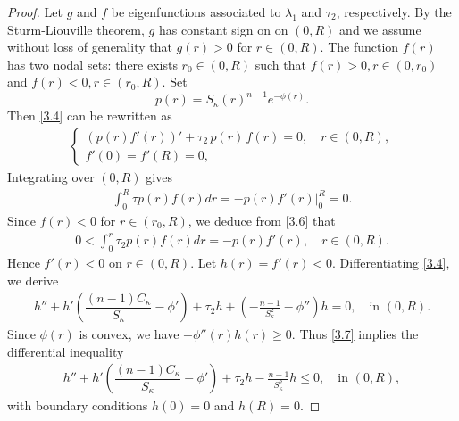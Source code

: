 \documentclass[10pt,a4paper]{amsart}
\def\k{\kappa}
\def\l{\lambda}
\begin{document}
\begin{proof}
 Let $g$ and $f$ be eigenfunctions associated to $\l_1$ and $\tau_2$, respectively.
By the Sturm-Liouville theorem,  $g$ has constant sign on on $(0,R)$ and we assume without loss of generality that $g(r)>0$ for $r\in (0,R)$. The function $f(r)$ has two nodal sets: there exists $r_{0}\in (0,R)$ such that $f(r)>0,r\in (0,r_{0})$ and $f(r)<0,r\in (r_{0},R)$.
Set
$$
p(r)=S_{\k}(r)^{n-1}e^{-\phi(r)}.
$$
Then  \eqref{3.4} can be rewritten as 
\begin{align*}
\begin{cases}
\left(p(r)f'(r)\right)' + \tau_2 \,p(r)\,f(r) = 0, \quad r\in (0, R),\\
f'(0) = f'(R) = 0,
\end{cases}
\end{align*}
Integrating over $(0,R)$ gives
\begin{align}\label{3.6}
    \int_{0}^{R}\tau p(r)f(r)dr=-p(r)f'(r)\Big|_{0}^{R}=0.
\end{align}
Since $f(r)<0$ for $r\in (r_{0},R)$, we deduce from \eqref{3.6} that
\begin{align*}
    0<\int_{0}^{r}\tau_2 p(r)f(r)dr=-p(r)f'(r), \quad r\in (0, R).
\end{align*}
 Hence $f'(r)<0 $ on $ r\in (0,R)$.
Let $h(r)=f'(r)<0$. Differentiating \eqref{3.4}, we derive
\begin{align}\label{3.7}
   h'' + h'\left(\dfrac{(n-1)C_{\kappa}}{S_{\kappa}} - \phi'\right) + \tau_2 h+(-\frac{n-1}{S_{\k}^{2}}-\phi'')h = 0, \quad \text{in } (0,R).
\end{align}
Since $\phi(r)$ is convex, we have $-\phi''(r)h(r)\geq 0$.  Thus  \eqref{3.7} implies the differential inequality
\begin{align}\label{3.8}
    h'' + h'\left(\dfrac{(n-1)C_{\kappa}}{S_{\kappa}} - \phi'\right) + \tau_2 h-\frac{n-1}{S_{\k}^{2}}h \leq  0, \quad \text{in } (0,R),
\end{align}
with boundary conditions  $h(0)=0$ and $h(R)=0$.


\end{proof}
\end{document}
